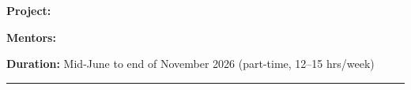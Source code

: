 {{{            %
            \begin{center}
                {\color{white}\textbf{Project:}} \projecttitle
            \end{center}
            
            \begin{center}
                {\color{white}\textbf{Mentors:}} \mentors
            \end{center}
            
            \begin{center}
                {\color{white}\textbf{Duration:}} Mid-June to end of November 2026 (part-time, 12--15 hrs/week)
            \end{center}
            
            \vspace{0.3cm}
            
            \begin{center}
                \textcolor{white}{\rule{0.8\textwidth}{0.3pt}}
            \end{center}
            
            \vspace{0.3cm}
            
            \begin{center}
                {\color{white}\textbf{\myname}}
            \end{center}
            
            \begin{center}
                {\color{white}\mydegree}
            \end{center}
            
            \begin{center}
                {\color{white}\href{\githuburl}{\color{white}\mygithub}}
            \end{center}
            
            \begin{center}
                {\color{white}\mylocation}
            \end{center}
            
            \begin{center}
                {\color{white}\texttt{\myemail}}
            \end{center}
            
            \vspace{0.8cm}
        }%
    }%
}

